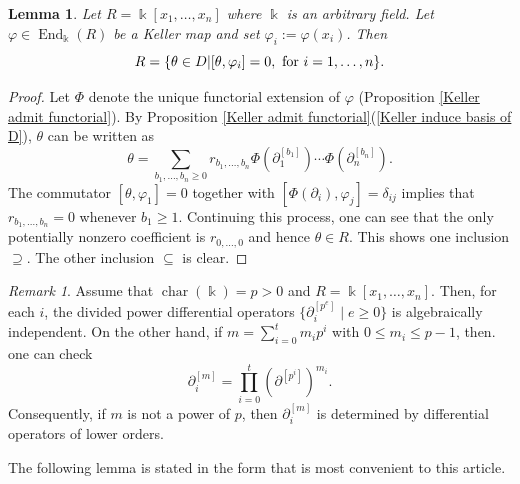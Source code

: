 \documentclass[11pt]{amsart}
\newtheorem{lemma}[theorem]{Lemma}
\theoremstyle{definition}
\theoremstyle{remark}
\newtheorem{remark}[theorem]{Remark}
\numberwithin{equation}{subsection}
\DeclareMathOperator{\kk}{\Bbbk}
\DeclareMathOperator{\ch}{char}
\DeclareMathOperator{\End}{End}
\begin{document}
\begin{lemma}
\label{keller acts as variable}
Let $R=\kk[x_1,\dots,x_n]$ where $\kk$ is an arbitrary field. Let $\varphi\in \End_{\kk}(R)$ be a Keller map and set $\varphi_i:=\varphi(x_i)$. Then
\[R=\{\theta\in D| [\theta, \varphi_i]=0,\ {\rm for}\ i=1,\dots,n\}.\]
\end{lemma}
\begin{proof}
Let $\Phi$ denote the unique functorial extension of $\varphi$ (Proposition \ref{Keller admit functorial}). By Proposition \ref{Keller admit functorial}(\ref{Keller induce basis of D}), $\theta$ can be written as 
\[\theta=\sum_{b_1,\dots,b_n\geq 0} r_{b_1,\dots,b_n}\Phi(\partial^{[b_1]}_1)\cdots \Phi(\partial^{[b_n]}_n).\]
The commutator $[\theta,\varphi_1]=0$ together with $[\Phi(\partial_i),\varphi_j]=\delta_{ij}$ implies that $r_{b_1,\dots,b_n}=0$ whenever $b_1\geq 1$. Continuing this process, one can see that the only potentially nonzero coefficient is $r_{0,\dots,0}$ and hence $\theta\in R$. This shows one inclusion $\supseteq$. The other inclusion $\subseteq$ is clear.
\end{proof}

\begin{remark}
\label{diff oper in char p}
Assume that $\ch(\kk)=p>0$ and $R=\kk[x_1,\dots,x_n]$. Then, for each $i$, the divided power differential operators $\{\partial^{[p^e]}_i\mid e\geq 0\}$ is algebraically independent. On the other hand, if $m=\sum_{i=0}^t m_ip^i$ with $0\leq m_i\leq p-1$, then. one can check
\[\partial^{[m]}_i=\prod_{i=0}^t (\partial^{[p^i]})^{m_i}.\]
Consequently, if $m$ is not a power of $p$, then $\partial^{[m]}_i$ is determined by differential operators of lower orders.
\end{remark}

The following lemma is stated in the form that is most convenient to this article.
\end{document}
